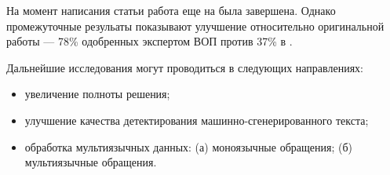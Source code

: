 \conclusion

На момент написания статьи работа еще на была завершена. Однако промежуточные резульаты показывают улучшение относительно оригинальной работы \cite{original} --- 78\% одобренных экспертом ВОП против 37\% в \cite{original}.

Дальнейшие исследования могут проводиться в следующих направлениях:
\begin{itemize}
\item увеличение полноты решения;
\item улучшение качества детектирования машинно-сгенерированного текста;
\item обработка мультиязычных данных: (а) моноязычные обращения; (б) мультиязычные обращения.
\end{itemize}